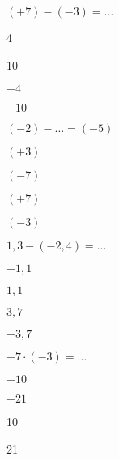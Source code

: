 \begin{QCM}
\begin{GroupeQCM}
    
    \begin{exercice}
      $(+ 7) - (- 3) = \ldots$
      \begin{ChoixQCM}{4}
      \item 4
      \item 10
      \item $- 4$
      \item $- 10$
      \end{ChoixQCM}
\begin{corrige}
   \end{corrige}
    \end{exercice}
    
    
    \begin{exercice}
      $(- 2) - \ldots = (- 5)$
      \begin{ChoixQCM}{4}
      \item $(+ 3)$
      \item $(- 7)$
      \item $(+ 7)$
      \item $(- 3)$
      \end{ChoixQCM}
\begin{corrige}
   \end{corrige}
    \end{exercice}
    
    
    \begin{exercice}
      $1,3 - (- 2,4) = \ldots$
      \begin{ChoixQCM}{4}
      \item $- 1,1$
      \item $1,1$
      \item $3,7$
      \item $- 3,7$
      \end{ChoixQCM}
\begin{corrige}
   \end{corrige}
    \end{exercice}
    
    
    \begin{exercice}
      $- 7 \cdot (- 3) = \ldots$
      \begin{ChoixQCM}{4}
      \item $- 10$
      \item $- 21$
      \item 10
      \item 21
      \end{ChoixQCM}
\begin{corrige}
   \end{corrige}
    \end{exercice}
    

\end{GroupeQCM}
\end{QCM}
